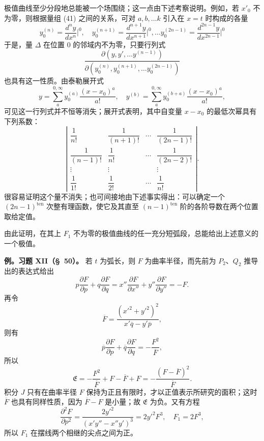 \documentclass[11pt,a4paper,leqno]{article}
\begin{document}
极值曲线至少分段地总能被一个场围绕；这一点由下述考察说明。例如，若 $x'_0$ 不为零，则根据量组 (41) 之间的关系，可对 $a,b,\ldots k$ 引入在 $x=t$ 时构成的各量
\[
y_0^{(n)}=\frac{d^ny}{dx^n}\bigg|^0,\quad
y_0^{(n+1)}=\frac{d^{n+1}y}{dx^{n+1}}\bigg|^0,\ldots
y_0^{(2n-1)}=\frac{d^{2n-1}y}{dx^{2n-1}}\bigg|^0
\]
于是，量 $\Delta$ 在位置 0 的邻域内不为零，只要行列式
\[
\frac{\partial(y,y',\ldots y^{(n-1)})}
{\partial(y_0^{(n)},y_0^{(n+1)},\ldots y_0^{(2n-1)})}
\]
也具有这一性质。由泰勒展开式
\[
y=\sum_a^{0,\infty}y_0^{(a)}\frac{(x-x_0)^a}{a!},\quad
y^{(b)}=\sum_a^{0,\infty}y_0^{(b+a)}\frac{(x-x_0)^a}{a!},
\]
可见这一行列式并不恒等消失；展开式表明，其中自变量 $x-x_0$ 的最低次幂具有下列系数：
\[
\left|
\begin{array}{cccc}
\dfrac1{n!}&\dfrac1{(n+1)!}&\cdots&\dfrac1{(2n-1)!}\\[2mm]
\dfrac1{(n-1)!}&\dfrac1{n!}&\cdots&\dfrac1{(2n-2)!}\\
\vdots&\vdots&&\vdots\\
\dfrac1{1!}&\dfrac1{2!}&\cdots&\dfrac1{n!}
\end{array}
\right|.
\]
很容易证明这个量不消失；也可间接地由下述事实得出：可以确定一个 $(2n-1)^{\mathrm{ten}}$ 次整有理函数，使它及其直至 $(n-1)^{\mathrm{ten}}$ 阶的各阶导数在两个位置取给定值。

由此证明，在其上 $F_1$ 不为零的极值曲线的任一充分短弧段，总能给出上述意义的一个极值。

\noindent\textbf{例。习题 XII（\S~50）。} 若 $t$ 为弧长，则 $F$ 为曲率半径，而先前为 $P_2$、$Q_2$ 推导出的表达式给出
\[
p\frac{\partial F}{\partial p}+q\frac{\partial F}{\partial q}
=x''\frac{\partial F}{\partial x''}+y''\frac{\partial F}{\partial y''}=-F.
\]
再令
\[
\overline{F}=\frac{(x'^2+y'^2)^2}{x'\overline{q}-y'\overline{p}},
\]
则有
\[
\overline{p}\frac{\partial F}{\partial p}
+\overline{q}\frac{\partial F}{\partial q}
=-\frac{F^2}{\overline{F}},
\]
所以
\[
\mathfrak{E}=-\frac{F^2}{\overline{F}}+F-\overline{F}+F
=-\frac{(F-\overline{F})^2}{\overline{F}}.
\]
积分 $J$ 只有在曲率半径 $F$ 保持为正且有限时，才以正值表示所研究的面积；这时 $\overline{F}$ 也具有同样性质，因为 $\overline{F}-F$ 是小量；故 $\mathfrak{E}$ 为负。又有方程
\[
\frac{\partial^2F}{\partial p^2}
=\frac{2y'^2}{(x'y''-x''y')^3}
=2y'^2F^3,\quad F_1=2F^3,
\]
所以 $F_1$ 在摆线两个相继的尖点之间为正。
\end{document}
